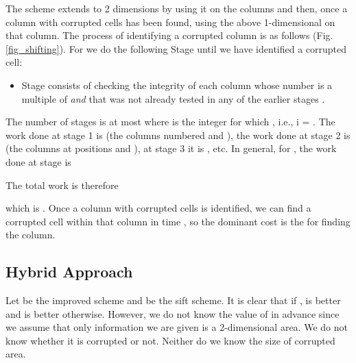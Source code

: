 \documentclass{llncs}
\begin{document}
\begin{figure*}
\centerline{\subfigure[Stage =1]{\texttt{[image: 1]}
\label{fig_1}}
\hfil
\subfigure[Stage =2]{\texttt{[image: 2]}
\label{fig_2}}
\hfil
\subfigure[Stage =3]{\texttt{[image: 3]}
\label{fig_3}}
\hfil
\subfigure[A corrupted oval green area is detected at stage =4 ]{\texttt{[image: 5]}
\label{fig_5}}}
\caption{A Sifting Approach}
\label{fig_shifting}
\end{figure*}

The scheme extends to 2 dimensions by using it
on the columns and then, once a column with corrupted
cells has been found, using the above 1-dimensional 
on that column.  The process of
identifying a corrupted column is as follows (Fig. \ref{fig_shifting}). 
For  we do the following
Stage  until we have identified a corrupted cell:

\begin{itemize}
\item
Stage  consists of checking the integrity of
each column whose number is a multiple of 
{\em and} that was not already tested in any of
the earlier stages .
\end{itemize}

The number of stages is at most  where
 is the integer for which
, i.e., i = .
The work done at stage 1 is  (the columns 
numbered  and ), the work done at stage 2 is 
(the columns at positions  and ), at stage 3
it is , etc.  In general,
for , the work done at stage  is 



The total work is therefore



\noindent which is .  
Once a column with corrupted cells is identified, 
we can find a corrupted cell within that column
in time , so the dominant cost
is the  for finding the column.

\subsection{Hybrid Approach}
\label{HybridApproach}
Let  be the improved scheme and  be the sift scheme.
It is clear that if ,  is better and  is better otherwise.
However, we do not know the value of  in advance
since we assume that only information we are given is a 2-dimensional area.
We do not know whether it is corrupted or not. Neither do we know the size of corrupted area.
\end{document}
